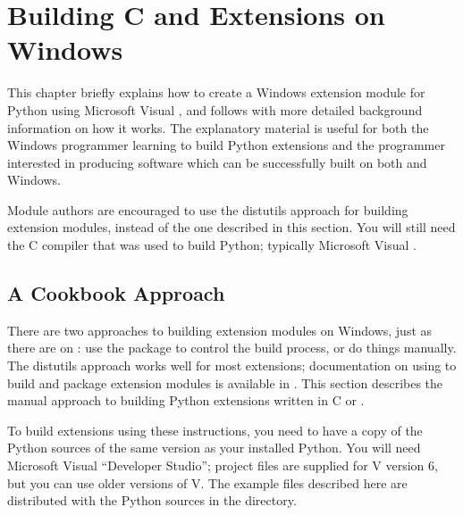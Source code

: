 \chapter{Building C and \Cpp{} Extensions on Windows%
     \label{building-on-windows}}


This chapter briefly explains how to create a Windows extension module
for Python using Microsoft Visual \Cpp, and follows with more
detailed background information on how it works.  The explanatory
material is useful for both the Windows programmer learning to build
Python extensions and the \UNIX{} programmer interested in producing
software which can be successfully built on both \UNIX{} and Windows.

Module authors are encouraged to use the distutils approach for
building extension modules, instead of the one described in this
section. You will still need the C compiler that was used to build
Python; typically Microsoft Visual \Cpp.

\section{A Cookbook Approach \label{win-cookbook}}

There are two approaches to building extension modules on Windows,
just as there are on \UNIX: use the  package to
control the build process, or do things manually.  The distutils
approach works well for most extensions; documentation on using
 to build and package extension modules is
available in .  This section describes the manual approach to building
Python extensions written in C or \Cpp.

To build extensions using these instructions, you need to have a copy
of the Python sources of the same version as your installed Python.
You will need Microsoft Visual \Cpp{} ``Developer Studio''; project
files are supplied for V\Cpp{} version 6, but you can use older
versions of V\Cpp.  The example files described here are distributed
with the Python sources in the  directory.

